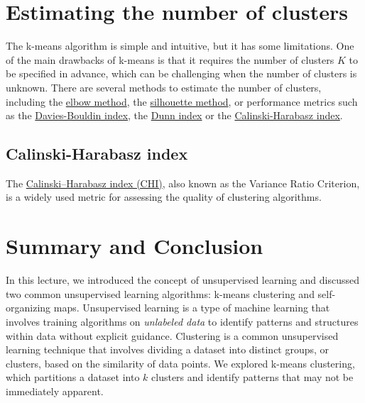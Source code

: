 \documentclass{article}[11pt]
\begin{document}
\section{Estimating the number of clusters}
The k-means algorithm is simple and intuitive, but it has some limitations.
One of the main drawbacks of k-means is that it requires the number of clusters $K$ to be specified in advance, which can be challenging when the number of clusters is unknown.
There are several methods to estimate the number of clusters, including the \href{https://en.wikipedia.org/wiki/Elbow_method_(clustering)}{elbow method}, 
the \href{https://en.wikipedia.org/wiki/Silhouette_(clustering)}{silhouette method}, or performance metrics 
such as the \href{https://en.wikipedia.org/wiki/Davies%E2%80%93Bouldin_index}{Davies-Bouldin index}, the \href{https://en.wikipedia.org/wiki/Dunn_index}{Dunn index}
or the \href{https://en.wikipedia.org/wiki/Calinski%E2%80%93Harabasz_index}{Calinski-Harabasz index}.

\subsection{Calinski-Harabasz index}
The \href{https://en.wikipedia.org/wiki/Calinski%E2%80%93Harabasz_index}{Calinski–Harabasz index (CHI)}, also known as the Variance Ratio Criterion, 
is a widely used metric for assessing the quality of clustering algorithms.



\section{Summary and Conclusion}
In this lecture, we introduced the concept of unsupervised learning and discussed two common unsupervised learning algorithms: k-means clustering and self-organizing maps.
Unsupervised learning is a type of machine learning that involves training algorithms on \textit{unlabeled data} to identify patterns and structures within data without explicit guidance.
Clustering is a common unsupervised learning technique that involves dividing a dataset into distinct groups, or clusters, based on the similarity of data points.
We explored k-means clustering, which partitions a dataset into $k$ clusters and identify patterns that may not be immediately apparent.


\end{document}
